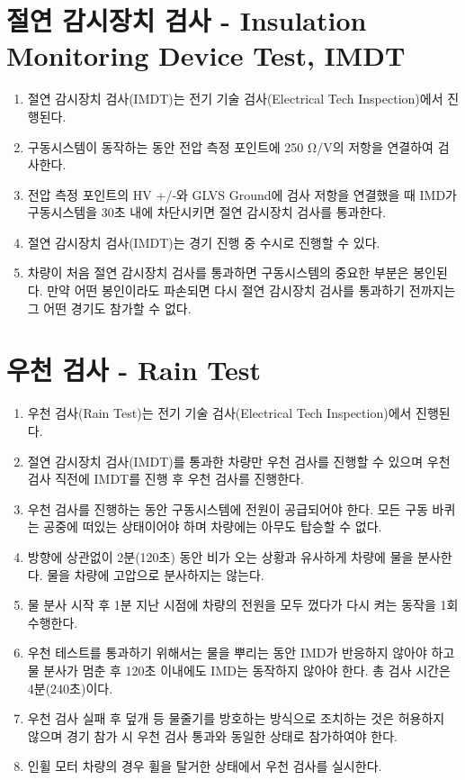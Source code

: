 \documentclass[final,a4paper,10pt]{report}
\begin{document}
\section{절연 감시장치 검사 - Insulation Monitoring Device Test, IMDT}
\begin{enumerate}
  \item 절연 감시장치 검사(IMDT)는 전기 기술 검사(Electrical Tech Inspection)에서 진행된다.
  \item 구동시스템이 동작하는 동안 전압 측정 포인트에 250 Ω/V의 저항을 연결하여 검사한다.
  \item 전압 측정 포인트의 HV +/-와 GLVS Ground에 검사 저항을 연결했을 때 IMD가 구동시스템을 30초 내에 차단시키면 절연 감시장치 검사를 통과한다.
  \item 절연 감시장치 검사(IMDT)는 경기 진행 중 수시로 진행할 수 있다.
  \item 차량이 처음 절연 감시장치 검사를 통과하면 구동시스템의 중요한 부분은 봉인된다. 만약 어떤 봉인이라도 파손되면 다시 절연 감시장치 검사를 통과하기 전까지는 그 어떤 경기도 참가할 수 없다.
\end{enumerate}

\section{우천 검사 - Rain Test}
\begin{enumerate}
  \item 우천 검사(Rain Test)는 전기 기술 검사(Electrical Tech Inspection)에서 진행된다.
  \item 절연 감시장치 검사(IMDT)를 통과한 차량만 우천 검사를 진행할 수 있으며 우천 검사 직전에 IMDT를 진행 후 우천 검사를 진행한다.
  \item 우천 검사를 진행하는 동안 구동시스템에 전원이 공급되어야 한다. 모든 구동 바퀴는 공중에 떠있는 상태이어야 하며 차량에는 아무도 탑승할 수 없다.
  \item 방향에 상관없이 2분(120초) 동안 비가 오는 상황과 유사하게 차량에 물을 분사한다. 물을 차량에 고압으로 분사하지는 않는다.
  \item 물 분사 시작 후 1분 지난 시점에 차량의 전원을 모두 껐다가 다시 켜는 동작을 1회 수행한다.
  \item 우천 테스트를 통과하기 위해서는 물을 뿌리는 동안 IMD가 반응하지 않아야 하고 물 분사가 멈춘 후 120초 이내에도 IMD는 동작하지 않아야 한다. 총 검사 시간은 4분(240초)이다.
  \item 우천 검사 실패 후 덮개 등 물줄기를 방호하는 방식으로 조치하는 것은 허용하지 않으며 경기 참가 시 우천 검사 통과와 동일한 상태로 참가하여야 한다.
  \item 인휠 모터 차량의 경우 휠을 탈거한 상태에서 우천 검사를 실시한다.
\end{enumerate}
\end{document}
